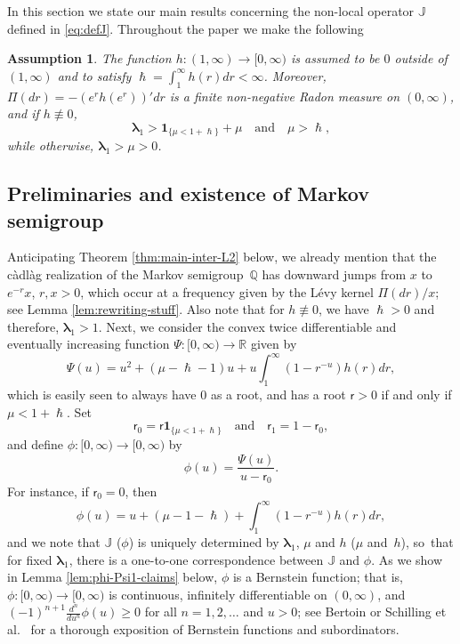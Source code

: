 \documentclass[JEP,XML,SOM,Unicode]{cedram}
\theoremstyle{plain}
\newtheorem{assmp}{Assumption}
\theoremstyle{definition}
\newcommand{\R}{\mathbb{R}}
\newcommand{\J}{\mathds{Q}}
\newcommand{\calJ}{\mathds{J}}
\newcommand{\lam}{{\bm{\lambda}_1}}
\newcommand{\tet}{{\mathsf{r}_0}}
\newcommand{\vat}{{\mathsf{r}_1}}
\let\h\hslash
\let\mo\mu
\begin{document}
In this section we state our main results concerning the non-local operator $\calJ$ defined in \eqref{eq:defJ}.
Throughout the paper we make the following
\begin{assmp}
\label{assA}
The function $h \colon (1,\infty)\!\to\![0,\infty)$ is assumed to be $0$ outside of~$(1,\infty)$ and to satisfy
$\h = \int_1^\infty h(r)dr < \infty$. Moreover, $\Pi(dr) = -(e^rh(e^r))'dr$ is a finite non-negative Radon
measure on $(0,\infty)$, and if $h \not\equiv 0$,
\begin{equation*}
\lam > \bm{1}_{\{\mo < 1+\h\}} + \mo \quad \text{and} \quad \mo > \h,
\end{equation*}
while otherwise, $\lam > \mo > 0$.
\end{assmp}

\subsection{Preliminaries and existence of Markov semigroup}

Anticipating Theorem \ref{thm:main-inter-L2} below, we already mention that the càdlàg realization of the Markov semigroup~$\J$ has downward jumps from $x$ to $e^{-r}x$, $r,x > 0$, which occur at a frequency given by the Lévy kernel $\Pi(dr)/x$; see Lemma \ref{lem:rewriting-stuff}. Also note that for $h \not\equiv 0$, we have $\h >0$ and therefore, $\lam >1$. Next, we consider the convex twice differentiable and eventually increasing function $\Psi \colon [0,\infty) \to \R$ given by
\begin{equation}
\label{eq:defpsi}
\Psi(u) = u^2 + (\mo-\h-1)u + u \int_1^\infty (1-r^{-u})h(r)dr,
\end{equation}
which is easily seen to always have 0 as a root, and has a root $\mathsf{r} > 0$ if and only if $\mo < 1 + \h$. Set
\begin{equation}
\label{eq:def-root}
\tet = \mathsf{r}\bm{1}_{\{\mo < 1+\h\}} \quad \text{and} \quad \vat = 1-\tet,
\end{equation}
and define $\phi \colon [0,\infty) \to [0,\infty)$ by
\begin{equation}
\label{eq:def-phi}
\phi(u) = \frac{\Psi(u)}{u-\tet}.
\end{equation}
For instance, if $\tet = 0$, then
\begin{equation*}
\phi(u) = u + (\mo-1-\h) + \int_1^\infty (1-r^{-u})h(r)dr,
\end{equation*}
and we note that $\calJ$ (\resp $\phi$) is uniquely determined by $\lam$, $\mo$ and $h$ (\resp $\mo$ and~$h$), so~that for fixed $\lam$, there is a one-to-one correspondence between $\calJ$ and $\phi$. As we show in Lemma \ref{lem:phi-Psi1-claims} below, $\phi$ is a Bernstein function; that is, $\phi \colon [0,\infty) \to [0,\infty)$ is continuous, infinitely differentiable on $(0, \infty)$, and $(-1)^{n+1}\frac{d^n }{du^n}\phi(u)\geq 0$ for all $n = 1,2,\ldots$ and $u > 0$; see Bertoin \cite{Bertoin-s} or Schilling et al.~\cite{SchillingSongVondracek10} for a thorough exposition of Bernstein functions and subordinators.
\end{document}

